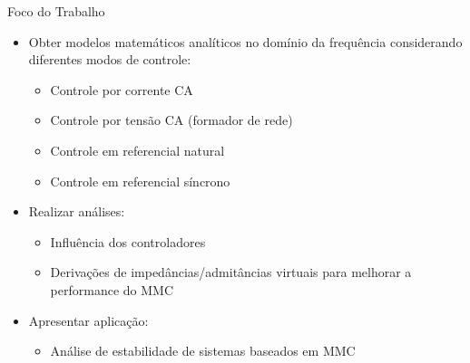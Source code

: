 \begin{frame}{Foco do Trabalho}



\begin{itemize}
	\item Obter modelos matemáticos analíticos no domínio da frequência considerando diferentes modos de controle: 
	
	\begin{itemize}
		\item Controle por corrente CA
		\item Controle por tensão CA (formador de rede)
		\item Controle em referencial natural
		\item Controle em referencial síncrono
	\end{itemize}

	\item Realizar análises:
	
	\begin{itemize}
		\item Influência dos controladores
		\item Derivações de impedâncias/admitâncias virtuais para melhorar a performance do MMC
	\end{itemize}
	
	\item Apresentar aplicação:
	
	\begin{itemize}
		\item Análise de estabilidade de sistemas baseados em MMC
	\end{itemize}
	
	
\end{itemize}












%
%	
%	
%	
%	


\end{frame}





